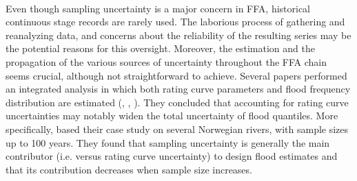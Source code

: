 \documentclass[11pt]{article}
\begin{document}
    \paragraph{}
    Even though sampling uncertainty is a major concern in FFA, historical continuous stage records are rarely used. The laborious process of gathering and reanalyzing data, and concerns about the reliability of the resulting series may be the potential reasons for this oversight. Moreover, the estimation and the propagation of the various sources of uncertainty throughout the FFA chain seems crucial, although not straightforward to achieve. Several papers performed an integrated analysis in which both rating curve parameters and flood frequency distribution are estimated (\citet{petersen-overleir_accounting_2009}, \citet{steinbakk_propagation_2016}, \citet{vieira_assessing_2022}). They concluded that accounting for rating curve uncertainties may notably widen the total uncertainty of flood quantiles. More specifically, \citet{steinbakk_propagation_2016} based their case study on several Norwegian rivers, with sample sizes up to 100 years. They found that sampling uncertainty is generally the main contributor (i.e. versus rating curve uncertainty) to design flood estimates and that its contribution decreases when sample size increases.
\end{document}
